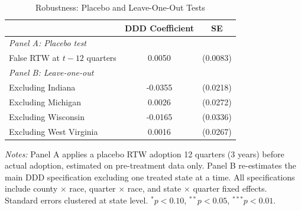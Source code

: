 \begin{table}[htbp]
\centering
\caption{Robustness: Placebo and Leave-One-Out Tests}
\label{tab:robustness}
\begin{threeparttable}
\begin{tabular}{lcc}
\toprule
 & DDD Coefficient & SE \\
\midrule
\textit{Panel A: Placebo test} & & \\
\quad False RTW at $t-12$ quarters & 0.0050 & (0.0083) \\
\midrule
\textit{Panel B: Leave-one-out} & & \\
\quad Excluding Indiana & -0.0355 & (0.0218) \\
\quad Excluding Michigan & 0.0026 & (0.0272) \\
\quad Excluding Wisconsin & -0.0165 & (0.0336) \\
\quad Excluding West Virginia & 0.0016 & (0.0267) \\
\bottomrule
\end{tabular}
\begin{tablenotes}[flushleft]\footnotesize
\item \textit{Notes:} Panel A applies a placebo RTW adoption 12 quarters (3 years) before actual adoption, estimated on pre-treatment data only. Panel B re-estimates the main DDD specification excluding one treated state at a time. All specifications include county $\times$ race, quarter $\times$ race, and state $\times$ quarter fixed effects. Standard errors clustered at state level. $^{*}p<0.10$, $^{**}p<0.05$, $^{***}p<0.01$.
\end{tablenotes}
\end{threeparttable}
\end{table}
